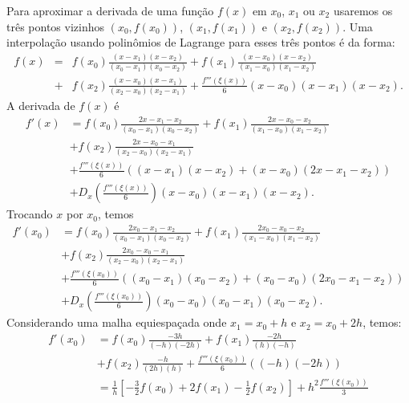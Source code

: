 Para aproximar a derivada de uma função $f(x)$ em $x_0$, $x_1$ ou $x_2$ usaremos os três pontos vizinhos $(x_0,f(x_0))$, $(x_{1},f(x_{1}))$ e $(x_{2},f(x_{2}))$. Uma interpolação usando polinômios de Lagrange para esses três pontos é da forma:
\begin{eqnarray*}
f(x)&=&f(x_0)\frac{(x-x_{1})(x-x_{2})}{(x_0-x_{1})(x_0-x_{2})}
+f(x_{1})\frac{(x-x_{0})(x-x_{2})}{(x_{1}-x_{0})(x_{1}-x_{2})}\\
&+&f(x_{2})\frac{(x-x_{0})(x-x_{1})}{(x_{2}-x_{0})(x_{2}-x_{1})} 
+\frac{f'''(\xi(x))}{6}(x-x_0)(x-x_{1})(x-x_{2}).
\end{eqnarray*}
A derivada de $f(x)$ é
\begin{equation}\label{tres_pontos}
  \begin{split}
    f'(x) &= f(x_0)\frac{2x-x_{1}-x_{2}}{(x_0-x_{1})(x_0-x_{2})}
    +f(x_{1})\frac{2x-x_{0}-x_{2}}{(x_{1}-x_{0})(x_{1}-x_{2})}\\
    &+f(x_{2})\frac{2x-x_{0}-x_{1}}{(x_{2}-x_{0})(x_{2}-x_{1})}\\
    &+\frac{f'''(\xi(x))}{6} \left( (x-x_{1})(x-x_{2}) +(x-x_0)(2x-x_{1}-x_{2})\right)\\
    &+ D_x\left(\frac{f'''(\xi(x))}{6}\right)(x-x_0)(x-x_1)(x-x_2).    
  \end{split}
\end{equation}
Trocando $x$ por $x_0$, temos
\begin{equation*}
  \begin{split}
    f'(x_0)&= f(x_0)\frac{2x_0-x_{1}-x_{2}}{(x_0-x_{1})(x_0-x_{2})}
    +f(x_{1})\frac{2x_0-x_{0}-x_{2}}{(x_{1}-x_{0})(x_{1}-x_{2})}\\
    &+f(x_{2})\frac{2x_0-x_{0}-x_{1}}{(x_{2}-x_{0})(x_{2}-x_{1})}\\
    &+ \frac{f'''(\xi(x_0))}{6} \left( (x_0-x_{1})(x_0-x_{2}) +(x_0-x_0)(2x_0-x_{1}-x_{2})\right)\\
    &+ D_x\left(\frac{f'''(\xi(x_0))}{6}\right)(x_0-x_0)(x_0-x_1)(x_0-x_2).
  \end{split}
\end{equation*}
Considerando uma malha equiespaçada onde $x_1=x_0+h$ e $x_2=x_0+2h$, temos:
\begin{equation*}
  \begin{split}
  f'(x_0)&= f(x_0)\frac{-3h}{(-h)(-2h)} + f(x_{1})\frac{-2h}{(h)(-h)} \\
  &+f(x_{2})\frac{-h}{(2h)(h)}+\frac{f'''(\xi(x_0))}{6} \left( (-h)(-2h)\right)\\
  &= \frac{1}{h}\left[-\frac{3}{2}f(x_0)+2f(x_{1})-\frac{1}{2}f(x_{2})\right]+h^2\frac{f'''(\xi(x_0))}{3}    
  \end{split}
\end{equation*}
